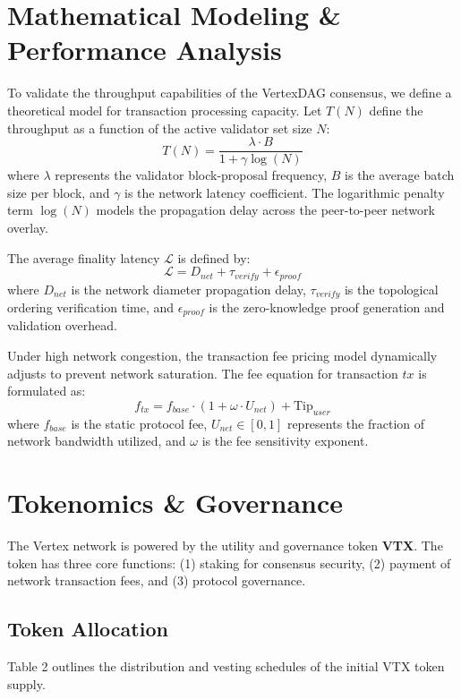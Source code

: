 \documentclass[10pt]{article}
\begin{document}
\section{Mathematical Modeling \& Performance Analysis}
To validate the throughput capabilities of the VertexDAG consensus, we define a theoretical model for transaction processing capacity. Let $T(N)$ define the throughput as a function of the active validator set size $N$:
\begin{equation}
T(N) = \frac{\lambda \cdot B}{1 + \gamma \log(N)}
\end{equation}
where $\lambda$ represents the validator block-proposal frequency, $B$ is the average batch size per block, and $\gamma$ is the network latency coefficient. The logarithmic penalty term $\log(N)$ models the propagation delay across the peer-to-peer network overlay.

The average finality latency $\mathcal{L}$ is defined by:
\begin{equation}
\mathcal{L} = D_{net} + \tau_{verify} + \epsilon_{proof}
\end{equation}
where $D_{net}$ is the network diameter propagation delay, $\tau_{verify}$ is the topological ordering verification time, and $\epsilon_{proof}$ is the zero-knowledge proof generation and validation overhead.

Under high network congestion, the transaction fee pricing model dynamically adjusts to prevent network saturation. The fee equation for transaction $tx$ is formulated as:
\begin{equation}
f_{tx} = f_{base} \cdot (1 + \omega \cdot U_{net}) + \text{Tip}_{user}
\end{equation}
where $f_{base}$ is the static protocol fee, $U_{net} \in [0, 1]$ represents the fraction of network bandwidth utilized, and $\omega$ is the fee sensitivity exponent.

\section{Tokenomics \& Governance}
The Vertex network is powered by the utility and governance token \textbf{VTX}. The token has three core functions: (1) staking for consensus security, (2) payment of network transaction fees, and (3) protocol governance.

\subsection{Token Allocation}
Table 2 outlines the distribution and vesting schedules of the initial VTX token supply.
\end{document}
